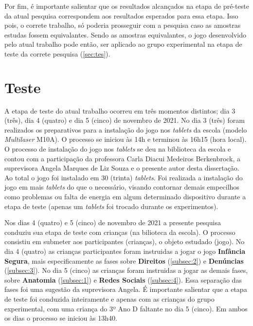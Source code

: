 Por fim, é importante salientar que os resultados alcançados na etapa de pré-teste da atual pesquisa correspondem aos resultados esperados para essa etapa. Isso pois, o correte trabalho, só poderia prosseguir com a pesquisa caso as amostras estudas fossem equivalantes. Sendo as amostras equivalantes, o jogo desenvolvido pelo atual trabalho pode então, ser aplicado ao grupo experimental na etapa de teste da correte pesquisa (\autoref{sec:tes}).


\section{Teste}\label{sec:tes}

A etapa de teste do atual trabalho ocorreu em três momentos distintos; dia 3 (três), dia 4 (quatro) e dia 5 (cinco) de novembro de 2021. No dia 3 (três) foram realizados os preparativos para a instalação do jogo nos \textit{tablets} da escola (modelo \textit{Multilaser} M10A). O processo se iniciou às 14h e terminou às 16h15 (hora local). O processo de instalação do jogo nos \textit{tablets} se deu na biblioteca da escola e contou com a participação da professora Carla Diacui Medeiros Berkenbrock, a suprevisora Angela Marques de Liz Souza e o presente autor desta dissertação. Ao total o jogo foi instalado em 30 (trinta) \textit{tablets}. Foi realizada a instalação do jogo em mais \textit{tablets} do que o necessário, visando contornar demais empecilhos como problemas ou falta de energia em algum determinado dispositivo durante a etapa de teste (apenas um \textit{tablets} foi trocado durante os experimentos). %

Nos dias 4 (quatro) e 5 (cinco) de novembro de 2021 a presente pesquisa conduziu sua etapa de teste com crianças (na bilioteca da escola). O processo consistiu em submeter aos participantes (crianças), o objeto estudado (jogo). No dia 4 (quatro) as crianças participantes foram instruidas a jogar o jogo \textbf{Infância Segura}, mais especificamente as fases sobre \textbf{Direitos} (\autoref{subsec:2}) e \textbf{Denúncias} (\autoref{subsec:3}). No dia 5 (cinco) as crianças foram instruidas a jogar as demais fases, sobre \textbf{Anatomia} (\autoref{subsec:1}) e \textbf{Redes Sociais} (\autoref{subsec:4}). Essa separação das fases foi uma sugestão da suprevisora Angela. É importante salientar que a etapa de teste foi conduzida inteiramente e apenas com as crianças do grupo experimental, com uma criança do 3º Ano D faltante no dia 5 (cinco). Em ambos os dias o processo se iniciou às 13h40.

